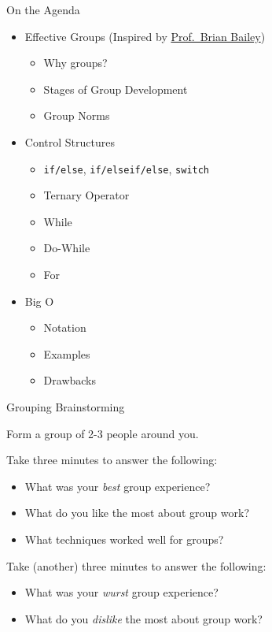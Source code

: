 \begin{frame}[fragile]{On the Agenda}

\begin{itemize}
\tightlist
\item
  Effective Groups (Inspired by
  \href{https://cs.illinois.edu/directory/profile/bpbailey}{Prof.~Brian
  Bailey})

  \begin{itemize}
  \tightlist
  \item
    Why groups?
  \item
    Stages of Group Development
  \item
    Group Norms
  \end{itemize}
\item
  Control Structures

  \begin{itemize}
  \tightlist
  \item
    \texttt{if/else}, \texttt{if/elseif/else}, \texttt{switch}
  \item
    Ternary Operator
  \item
    While
  \item
    Do-While
  \item
    For
  \end{itemize}
\item
  Big O

  \begin{itemize}
  \tightlist
  \item
    Notation
  \item
    Examples
  \item
    Drawbacks
  \end{itemize}
\end{itemize}

\end{frame}

\begin{frame}{Grouping Brainstorming}

Form a group of 2-3 people around you.

Take three minutes to answer the following:

\begin{itemize}
\tightlist
\item
  What was your \emph{best} group experience?
\item
  What do you like the most about group work?
\item
  What techniques worked well for groups?
\end{itemize}

Take (another) three minutes to answer the following:

\begin{itemize}
\tightlist
\item
  What was your \emph{wurst} group experience?
\item
  What do you \emph{dislike} the most about group work?
\end{itemize}

\end{frame}

